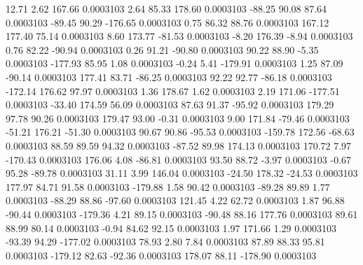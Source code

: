        12.71        2.62      167.66     0.0003103
        2.64       85.33      178.60     0.0003103
      -88.25       90.08       87.64     0.0003103
      -89.45       90.29     -176.65     0.0003103
        0.75       86.32       88.76     0.0003103
      167.12      177.40       75.14     0.0003103
        8.60      173.77      -81.53     0.0003103
       -8.20      176.39       -8.94     0.0003103
        0.76       82.22      -90.94     0.0003103
        0.26       91.21      -90.80     0.0003103
       90.22       88.90       -5.35     0.0003103
     -177.93       85.95        1.08     0.0003103
       -0.24        5.41     -179.91     0.0003103
        1.25       87.09      -90.14     0.0003103
      177.41       83.71      -86.25     0.0003103
       92.22       92.77      -86.18     0.0003103
     -172.14      176.62       97.97     0.0003103
        1.36      178.67        1.62     0.0003103
        2.19      171.06     -177.51     0.0003103
      -33.40      174.59       56.09     0.0003103
       87.63       91.37      -95.92     0.0003103
      179.29       97.78       90.26     0.0003103
      179.47       93.00       -0.31     0.0003103
        9.00      171.84      -79.46     0.0003103
      -51.21      176.21      -51.30     0.0003103
       90.67       90.86      -95.53     0.0003103
     -159.78      172.56      -68.63     0.0003103
       88.59       89.59       94.32     0.0003103
      -87.52       89.98      174.13     0.0003103
      170.72        7.97     -170.43     0.0003103
      176.06        4.08      -86.81     0.0003103
       93.50       88.72       -3.97     0.0003103
       -0.67       95.28      -89.78     0.0003103
       31.11        3.99      146.04     0.0003103
      -24.50      178.32      -24.53     0.0003103
      177.97       84.71       91.58     0.0003103
     -179.88        1.58       90.42     0.0003103
      -89.28       89.89        1.77     0.0003103
      -88.29       88.86      -97.60     0.0003103
      121.45        4.22       62.72     0.0003103
        1.87       96.88      -90.44     0.0003103
     -179.36        4.21       89.15     0.0003103
      -90.48       88.16      177.76     0.0003103
       89.61       88.99       80.14     0.0003103
       -0.94       84.62       92.15     0.0003103
        1.97      171.66        1.29     0.0003103
      -93.39       94.29     -177.02     0.0003103
       78.93        2.80        7.84     0.0003103
       87.89       88.33       95.81     0.0003103
     -179.12       82.63      -92.36     0.0003103
      178.07       88.11     -178.90     0.0003103
